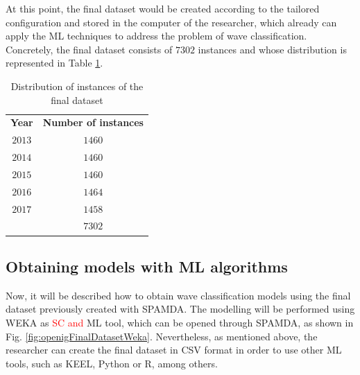 \documentclass[energies,article,submit,moreauthors,pdftex]{Definitions/mdpi}
\begin{document}
			At this point, the final dataset would be created according to the tailored configuration and stored in the computer of the researcher, which already can apply the ML techniques to address the problem of wave classification. Concretely, the final dataset consists of $7302$ instances and whose distribution is represented in Table \ref{tab:datasetDistribution}.
			
				\begin{table}[!h]
				
					\caption{Distribution of instances of the final dataset}
					\label{tab:datasetDistribution}
					\centering

					\begin{tabular}{cc}
					
						\cline{1-2}
						
						\textbf{Year}&\textbf{Number of instances}\\
	
						\cline{1-2}
						
						$2013$&$1460$\\
						$2014$&$1460$\\
						$2015$&$1460$\\
						$2016$&$1464$\\
						$2017$&$1458$\\
						
						\cline{1-2}
						
						&$7302$\\
						
						\cline{1-2}
							
					\end{tabular}
				
				\end{table}

		
		\subsection{Obtaining models with ML algorithms}
		
			Now, it will be described how to obtain wave classification models using the final dataset previously created with SPAMDA. The modelling will be performed using WEKA as \textcolor{red}{SC and} ML tool, which can be opened through SPAMDA, as shown in Fig. \ref{fig:openigFinalDatasetWeka}. Nevertheless, as mentioned above, the researcher can create the final dataset in CSV format in order to use other ML tools, such as KEEL, Python or R, among others.
			
\end{document}
